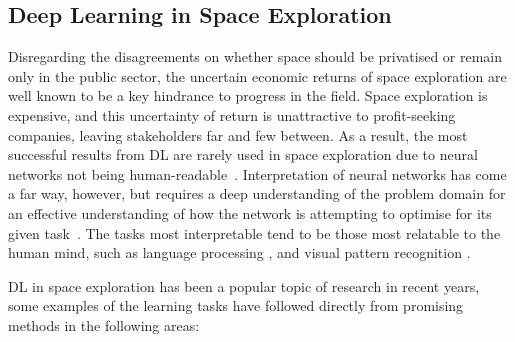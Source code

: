 \subsection{Deep Learning in Space Exploration}\label{ssec:dl-space}

Disregarding the disagreements on whether space should be privatised or remain only in the public sector, the uncertain economic returns of space exploration are well known to be a key hindrance to progress in the field. Space exploration is expensive, and this uncertainty of return is unattractive to profit-seeking companies, leaving stakeholders far and few between. As a result, the most successful results from \gls{DL} are rarely used in space exploration due to neural networks not being human-readable~\cite {esa_ai}. Interpretation of neural networks has come a far way, however, but requires a deep understanding of the problem domain for an effective understanding of how the network is attempting to optimise for its given task~\cite{Montavon2018, Sheu2020, goh2021multimodal, molnar_2022}. The tasks most interpretable tend to be those most relatable to the human mind, such as language processing \cite{belinkov-etal-2020-interpretability, DBLP:journals/corr/abs-2108-04840}, and visual pattern recognition \cite{DBLP:journals/corr/abs-1802-00121}.

\gls{DL} in space exploration has been a popular topic of research in recent
years, some examples of the learning tasks have followed directly from
promising methods in the following areas:

